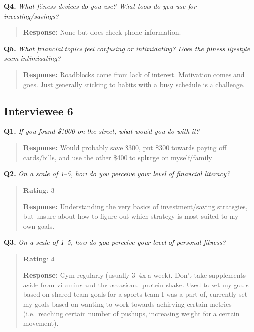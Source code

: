 \documentclass[12pt]{article}
\begin{document}
\medskip
\noindent\textbf{Q4.} \textit{What fitness devices do you use? What tools do you use for investing/savings?}

\begin{quote}
\textbf{Response:} None but does check phone information.\par
\end{quote}

\medskip
\noindent\textbf{Q5.} \textit{What financial topics feel confusing or intimidating? Does the fitness lifestyle seem intimidating?}

\begin{quote}
\textbf{Response:} Roadblocks come from lack of interest. Motivation comes and goes. Just generally sticking to habits with a busy schedule is a challenge.\par
\end{quote}

\subsection{Interviewee 6}

\medskip
\noindent\textbf{Q1.} \textit{If you found \$1000 on the street, what would you do with it?}

\begin{quote}
\textbf{Response:} Would probably save \$300, put \$300 towards paying off cards/bills, and use the other \$400 to splurge on myself/family.\par
\end{quote}

\medskip
\noindent\textbf{Q2.} \textit{On a scale of 1--5, how do you perceive your level of financial literacy?}

\begin{quote}
\textbf{Rating:} 3\par
\textbf{Response:} Understanding the very basics of investment/saving strategies, but unsure about how to figure out which strategy is most suited to my own goals.\par
\end{quote}

\medskip
\noindent\textbf{Q3.} \textit{On a scale of 1--5, how do you perceive your level of personal fitness?}

\begin{quote}
\textbf{Rating:} 4\par
\textbf{Response:} Gym regularly (usually 3--4x a week). Don't take supplements aside from vitamins and the occasional protein shake. Used to set my goals based on shared team goals for a sports team I was a part of, currently set my goals based on wanting to work towards achieving certain metrics (i.e.\ reaching certain number of pushups, increasing weight for a certain movement).\par
\end{quote}
\end{document}
